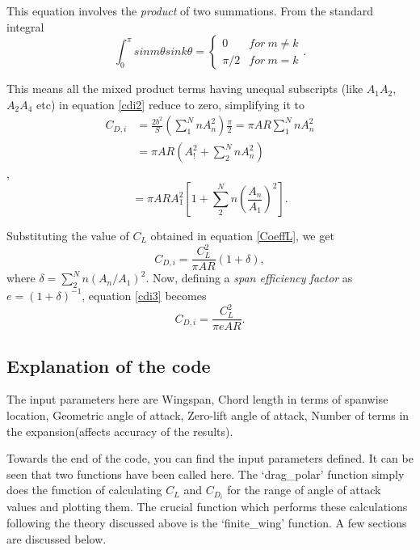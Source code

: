 \documentclass[letterpaper,12pt]{article}
\begin{document}
This equation involves the \textit{product} of two summations. From the standard integral
\begin{equation}
\int_0^\pi sinm\theta sink\theta =
\begin{cases}
0 &for\ m\neq k\\
\pi/2 &for\ m=k
\end{cases}.
\end{equation}

This means all the mixed product terms having unequal subscripts (like $A_1A_2$,$A_2A_4$ etc) in equation \ref{cdi2} reduce to zero, simplifying it to
\begin{align*}
C_{D,i} &= \frac{2b^2}{S}\left(\sum_1^NnA_n^2\right)\frac{\pi}{2} = \pi AR\sum_1^NnA_n^2\\
&= \pi AR\left(A_!^2+\sum_2^NnA_n^2\right)
\end{align*},
\begin{equation}
= \pi AR A_1^2\left[1+\sum_2^Nn{\left(\frac{A_n}{A_1}\right)}^2\right].
\end{equation}

Substituting the value of $C_L$ obtained in equation \ref{CoeffL}, we get
\begin{equation}
\boxed{
C_{D,i} = \frac{C_L^2}{\pi AR}(1+\delta),
}
\label{cdi3}
\end{equation}
where $\delta = \sum_2^Nn(A_n/A_1)^2$. Now, defining a \textit{span efficiency factor} as $e = (1+\delta)^{-1}$, equation \ref{cdi3} becomes
\begin{equation}
\boxed{
C_{D,i} = \frac{C_L^2}{\pi eAR}.
}
\end{equation}


\subsection{Explanation of the code}
\lstset{inputpath=./finite_wing/}

The input parameters here are Wingspan, Chord length in terms of spanwise location, Geometric angle of attack, Zero-lift angle of attack, Number of terms in the expansion(affects accuracy of the results).



Towards the end of the code, you can find the input parameters defined. It can be seen that two functions have been called here. The `drag\_polar' function simply does the function of calculating $C_L$ and $C_{D_i}$ for the range of angle of attack values and plotting them. The crucial function which performs these calculations following the theory discussed above is the `finite\_wing' function. A few sections are discussed below. 
\end{document}
